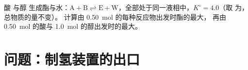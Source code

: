 \begin{exercise}[$\star\star\star$]\label{exo:b1:extent-q-and-k:12}
酸  与醇  生成酯与水：$\mathrm{A + B
\rightleftharpoons E + W}$，全部处于同一液相中，$K^\circ = 4.0$（取
为，总物质的量不变）。
计算由 \qty{0.50}{mol} 的每种反应物出发时酯的最大，
再由 \qty{0.50}{mol} 的酸与 \qty{1.0}{mol} 的醇出发时的最大。
\end{exercise}

\section{问题：制氢装置的出口}

